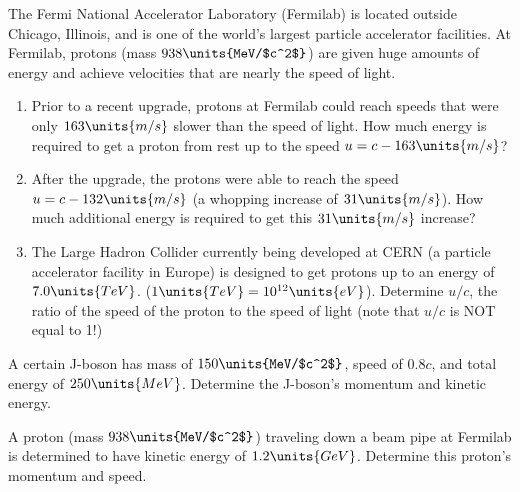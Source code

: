 \begin{problem}
The Fermi National Accelerator Laboratory (Fermilab) is located outside
Chicago, Illinois, and is one of the world's largest particle accelerator
facilities.  At Fermilab, protons (mass $938\units{MeV/$c^2$}$) are given
huge amounts of energy and achieve velocities that are nearly the speed
of light.
\begin{enumerate}
\item Prior to a recent upgrade, protons at Fermilab could reach
speeds that were only $163\units{m/s}$ slower than the speed of
light.  How much energy is required to get a proton from rest up to
the speed $u = c - 163\units{m/s}$?  
\item After the upgrade, the protons were able to reach the speed $u
=c - 132\units{m/s}$ (a whopping increase of $31\units{m/s}$).
How much additional energy is required to get this $31\units{m/s}$
increase?
\item The Large Hadron Collider currently being developed at CERN (a
  particle accelerator facility in Europe) is designed to get protons
  up to an energy of $7.0\units{TeV}$. ($1\units{TeV} =
  10^{12}\units{eV}$).  Determine $u/c$, the ratio of the speed of the
  proton to the speed of light (note that $u/c$ is NOT equal to 1!)
\end{enumerate}
\label{prob:fermilab}
\end{problem}

\begin{problem}
A certain J-boson has mass of $150\units{MeV/$c^2$}$, speed of
$0.8c$, and total energy of $250\units{MeV}$.  Determine
the J-boson's momentum and kinetic energy.
\label{prob:J}
\end{problem}

\begin{problem}
A proton (mass $938\units{MeV/$c^2$}$) traveling down a beam pipe at
Fermilab is determined to have kinetic energy of $1.2\units{GeV}$.
Determine this proton's momentum and speed.
\label{prob:fermilab2}
\end{problem}
\newpage

